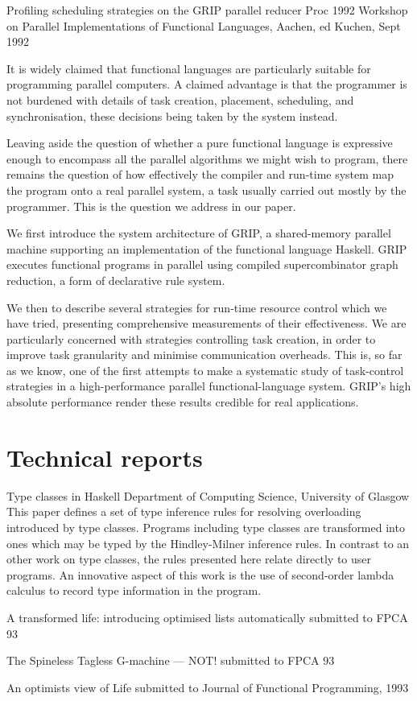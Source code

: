 {Profiling scheduling strategies on the GRIP parallel reducer}
{Proc 1992 Workshop on Parallel Implementations of Functional Languages, Aachen,
ed Kuchen, Sept 1992}
{It is widely claimed that functional languages are particularly
suitable for programming parallel computers.  A claimed advantage is
that the programmer is not burdened with details of task creation,
placement, scheduling, and synchronisation, these decisions being
taken by the system instead.

Leaving aside the question of whether a pure functional language is
expressive enough to encompass all the parallel algorithms we might
wish to program, there remains the question of how effectively the
compiler and run-time system map the program onto a real parallel
system, a task usually carried out mostly by the programmer.  This is
the question we address in our paper.

We first introduce the system architecture of GRIP, a shared-memory
parallel machine supporting an implementation of the functional
language Haskell.  GRIP executes functional programs in parallel using
compiled supercombinator graph reduction, a form of 
declarative rule system.

We then to describe several strategies for run-time resource
control which we have tried, presenting comprehensive measurements of
their effectiveness.  We are particularly concerned with strategies
controlling task creation, in order to improve task granularity and
minimise communication overheads.  This is, so far as we know, one of
the first attempts to make a systematic study of task-control
strategies in a high-performance parallel functional-language system.
GRIP's high absolute performance render these results credible for
real applications.
}

\section{Technical reports}

{Type classes in Haskell}
{Department of Computing Science, University of Glasgow}
{This paper defines a set of type inference rules for resolving
overloading introduced by type classes.  Programs including type
classes are transformed into ones which may be typed by the
Hindley-Milner inference rules.  In contrast to an other work on type
classes, the rules presented here relate directly to user programs.  An
innovative aspect of this work is the use of second-order lambda
calculus to record type information in the program.
}

{A transformed life: introducing optimised lists automatically}
{submitted to FPCA 93}
{}

{The Spineless Tagless G-machine --- NOT!}
{submitted to FPCA 93}

{An optimists view of Life}
{submitted to Journal of Functional Programming, 1993}
{}








